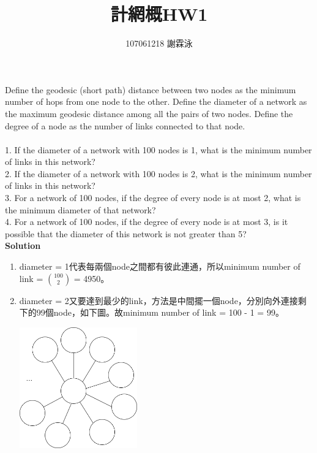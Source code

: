 \documentclass[oneside, 12pt]{article}
\begin{document}
\begin{CJK*}{UTF8}{bkai}

\title{計網概HW1}
\author{107061218 謝霖泳}
\date{}
\maketitle

Define the geodesic (short path) distance between two nodes as the minimum number of hops from one node to the other. Define the diameter of a network as the maximum geodesic distance among all the pairs of two nodes. Define the degree of a node as the number of links connected to that node.\\\\
1. If the diameter of a network with 100 nodes is 1, what is the minimum number of links in this network?\\
2. If the diameter of a network with 100 nodes is 2, what is the minimum number of links in this network?\\
3. For a network of 100 nodes, if the degree of every node is at most 2, what is the minimum diameter of that network?\\
4. For a network of 100 nodes, if the degree of every node is at most 3, is it possible that the diameter of this network is not greater than 5?\\

\textbf{Solution}
\begin{enumerate}
\item
diameter = 1代表每兩個node之間都有彼此連通，所以minimum number of link = $100 \choose 2$ = 4950。

\item
diameter = 2又要達到最少的link，方法是中間擺一個node，分別向外連接剩下的99個node，如下圖。故minimum number of link = 100 - 1 = 99。

\begin{center}
\includegraphics[width=2in]{problem2}
\end{center}


\end{enumerate}
\end{CJK*}
\end{document}
